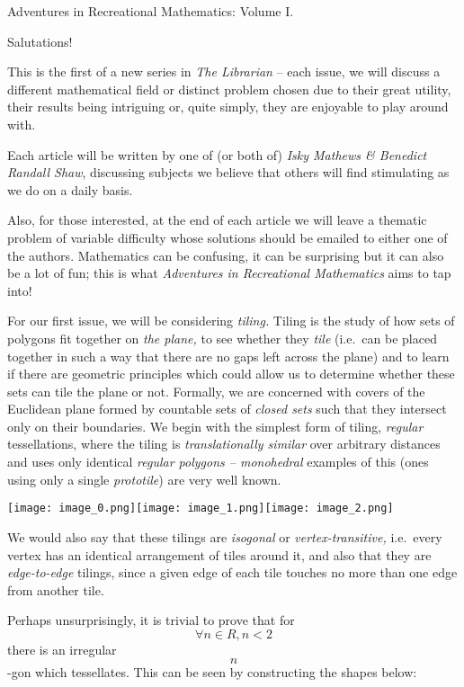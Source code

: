Adventures in Recreational Mathematics: Volume I.

Salutations!

This is the first of a new series in \emph{The Librarian }-- each issue,
we will discuss a different mathematical field or distinct problem
chosen due to their great utility, their results being intriguing or,
quite simply, they are enjoyable to play around with.

Each article will be written by one of (or both of) \emph{Isky Mathews
\& Benedict Randall Shaw}, discussing subjects we believe that others
will find stimulating as we do on a daily basis.

Also, for those interested, at the end of each article we will leave a
thematic problem of variable difficulty whose solutions should be
emailed to either one of the authors. Mathematics can be confusing, it
can be surprising but it can also be a lot of fun; this is what
\emph{Adventures in Recreational Mathematics }aims to tap into!

For our first issue, we will be considering \emph{tiling. }Tiling is the
study of how sets of polygons fit together on \emph{the plane, }to see
whether they \emph{tile }(i.e.~can be placed together in such a way that
there are no gaps left across the plane) and to learn if there are
geometric principles which could allow us to determine whether these
sets can tile the plane or not. Formally, we are concerned with covers
of the Euclidean plane formed by countable sets of \emph{closed sets
}such that they intersect only on their boundaries. We begin with the
simplest form of tiling, \emph{regular }tessellations, where the tiling
is \emph{translationally similar }over arbitrary distances and uses only
identical \emph{regular polygons -- monohedral }examples of this (ones
using only a single \emph{prototile}) are very well known.

\texttt{[image: image\_0.png]}\texttt{[image: image\_1.png]}\texttt{[image: image\_2.png]}

We would also say that these tilings are \emph{isogonal }or
\emph{vertex-transitive, }i.e.~every vertex has an identical arrangement
of tiles around it, and also that they are \emph{edge-to-edge }tilings,
since a given edge of each tile touches no more than one edge from
another tile.

Perhaps unsurprisingly, it is trivial to prove that for $$∀ n∈R, n<2$$
there is an irregular $$n$$-gon which tessellates. This can be seen by
constructing the shapes below:

